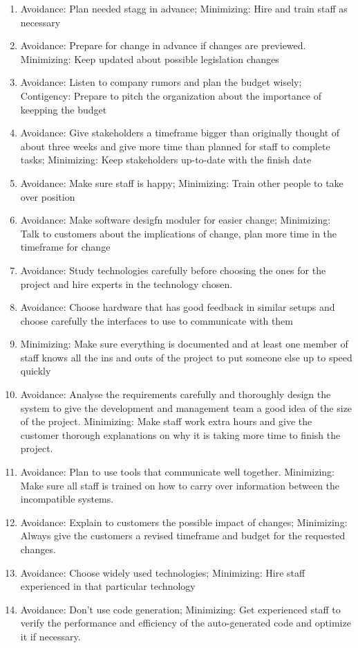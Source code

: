 \begin{enumerate}
    \item Avoidance: Plan needed stagg in advance; Minimizing: Hire and train staff as necessary
    \item Avoidance: Prepare for change in advance if changes are previewed. Minimizing: Keep updated about possible legislation changes
    \item Avoidance: Listen to company rumors and plan the budget wisely; Contigency: Prepare to pitch the organization about the importance of keepping the budget
    \item Avoidance: Give stakeholders a timeframe bigger than originally thought of about three weeks and give more time than planned for staff to complete tasks; Minimizing: Keep stakeholders up-to-date with the finish date
    \item Avoidance: Make sure staff is happy; Minimizing: Train other people to take over position
    \item Avoidance: Make software desigfn moduler for easier change; Minimizing: Talk to customers about the implications of change, plan more time in the timeframe for change
    \item Avoidance: Study  technologies carefully before choosing the ones for the project and hire experts in the technology chosen.
    \item Avoidance: Choose hardware that has good feedback in similar setups and choose carefully the interfaces to use to communicate with them
    \item Minimizing: Make sure everything is documented and at least one member of staff knows all the ins and outs of the project to put someone else up to speed quickly
    \item Avoidance: Analyse the requirements carefully and thoroughly design the system to give the development and management team a good idea of the size of the project. Minimizing: Make staff work extra hours and give the customer thorough explanations on why it is taking more time to finish the project.
    \item Avoidance: Plan to use tools that communicate well together. Minimizing: Make sure all staff is trained on how to carry over information between the incompatible systems.
    \item Avoidance: Explain to customers the possible impact of changes; Minimizing: Always give the customers a revised timeframe and budget for the requested changes.
    \item Avoidance: Choose widely used technologies; Minimizing: Hire staff experienced in that particular technology
    \item Avoidance: Don't use code generation; Minimizing: Get experienced staff to verify the performance and efficiency of the auto-generated code and optimize it if necessary.
\end{enumerate}

